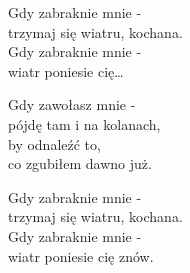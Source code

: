 \begin{text}
\begin{scriptTwelve}
    Gdy zabraknie mnie -\\
    trzymaj się wiatru, kochana.\\
    Gdy zabraknie mnie -\\
    wiatr poniesie cię…

    Gdy zawołasz mnie -\\
    pójdę tam i na kolanach,\\
    by odnaleźć to,\\
    co zgubiłem dawno już.

    Gdy zabraknie mnie -\\
    trzymaj się wiatru, kochana.\\
    Gdy zabraknie mnie -\\
    wiatr poniesie cię znów.
\end{scriptTwelve}
\end{text}
\begin{chord}

\end{chord}